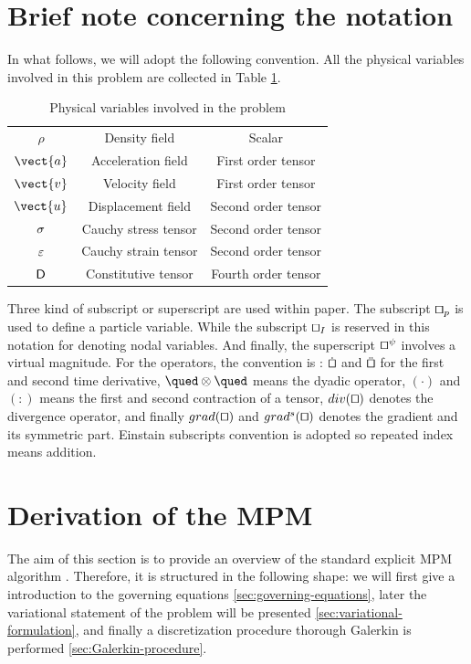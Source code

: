 \section{Brief note concerning the notation}
\label{sec:Notation}
In what follows, we will adopt the following convention. All the
physical variables involved in this problem are collected in Table
\ref{tab:notation-table}.

\begin{table}
  \centering
  \caption{Physical variables involved in the problem}
  \label{tab:notation-table}
  \begin{tabular}{c c c}
    $\rho$ & Density field & Scalar \\
    $\vect{a}$ & Acceleration field & First order tensor \\
    $\vect{v}$ & Velocity field & First order tensor \\
    $\vect{u}$ & Displacement field & Second order tensor \\
    $\mathsf{\sigma}$ & Cauchy stress tensor & Second order tensor \\
    $\mathsf{\varepsilon}$ & Cauchy strain tensor & Second order tensor \\
    $\mathsf{D}$ & Constitutive tensor & Fourth order tensor\\
  \end{tabular}
\end{table}

Three kind of subscript or superscript are used within paper. The
subscript $\qed_p$ is used to define a particle variable. While the
subscript $\qed_I$ is reserved in this notation for denoting nodal
variables. And finally, the superscript $\qed^{\psi}$ involves a virtual
magnitude. For the operators, the convention is : $\dot{\qed}$ and
$\ddot{\qed}$ for the first and second time derivative, $\qued \otimes
\qued$ means the dyadic operator, $(\cdot)$ and $(\colon)$ means the first
and second contraction of a tensor, $\Div{\qed}$
denotes the divergence operator, and finally $\Grad{\qed}$ and
$\GradS{\qed}$ denotes the gradient and its symmetric part. Einstain
subscripts convention is adopted so repeated index means addition.

\section{Derivation of the MPM}
\label{sec:derivation-mpm}
The aim of this section is to provide an overview of
the standard explicit MPM algorithm \cite{Sulsky1994}. Therefore, it
is structured in the following shape: we will first give a
introduction to the governing equations \ref{sec:governing-equations},
later the variational statement of the problem will be presented
\ref{sec:variational-formulation}, and finally a discretization
procedure thorough Galerkin is performed \ref{sec:Galerkin-procedure}.

